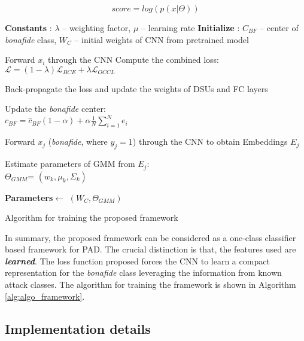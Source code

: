 \documentclass[journal]{IEEEtran}
\begin{document}
\begin{equation}
\label{eq:score}
score = log(p(x|\Theta))
\end{equation}

\begin{algorithm}[h]
\label{alg:algo_framework}
\SetAlgoLined
\DontPrintSemicolon

\textbf{Constants} : $\lambda$ -- weighting factor, $\mu$ -- learning rate \;
\textbf{Initialize} : $C_{BF}$ -- center of \textit{bonafide} class, $W_C$ -- initial weights of CNN from pretrained model \

 {

Forward $x_i$ through the CNN \;
Compute the combined loss: $\mathcal{L} = (1-\lambda)\mathcal{L}_{BCE} + \lambda \mathcal{L}_{OCCL}$ \;

Back-propagate the loss and update the weights of DSUs and FC layers \;

Update the \textit{bonafide} center: \\ $c_{BF}= \hat{c}_{BF} (1-\alpha) + \alpha \frac{1}{N}\sum_{i=1}^{N}e_{i}$ \;

}

Forward $x_j$ (\textit{bonafide}, where $y_j=1$) through the CNN to obtain Embeddings $E_j$ \;

Estimate parameters of GMM from ${E_j}$:\\ $\Theta_{GMM}$= $(w_k,\mu_k, \Sigma_k)$ \;

\textbf{Parameters}$\leftarrow$ $(W_C,\Theta_{GMM})$\;

\caption{Algorithm for training the proposed framework}
\end{algorithm}

In summary, the proposed framework can be considered as a one-class classifier based framework for PAD. The crucial distinction is that, the features used are \textit{\textbf{learned}}. The loss function proposed forces the CNN to learn a compact representation for the \textit{bonafide} class leveraging the information from known attack classes. The algorithm for training the framework is shown in Algorithm \ref{alg:algo_framework}.

\subsection{Implementation details}
\end{document}

